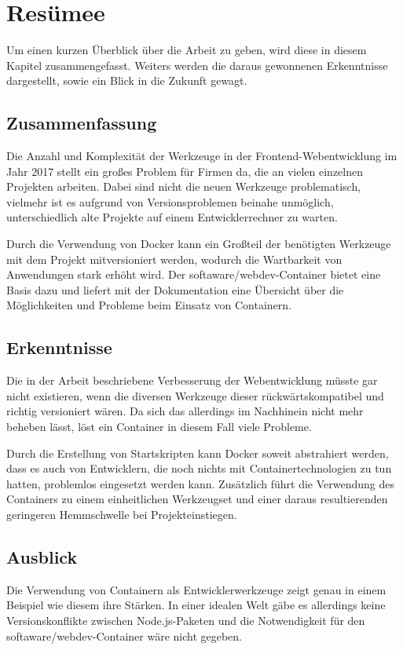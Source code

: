 \chapter{Resümee}
\label{cha:resume}
Um einen kurzen Überblick über die Arbeit zu geben, wird diese in diesem Kapitel zusammengefasst.
Weiters werden die daraus gewonnenen Erkenntnisse dargestellt, sowie ein Blick in die Zukunft gewagt.

\section{Zusammenfassung}
\label{sec:summary}
Die Anzahl und Komplexität der Werkzeuge in der Frontend-Webentwicklung im Jahr 2017 stellt ein großes Problem für Firmen da, die an vielen einzelnen Projekten arbeiten.
Dabei sind nicht die neuen Werkzeuge problematisch, vielmehr ist es aufgrund von Versionsproblemen beinahe unmöglich, unterschiedlich alte Projekte auf einem Entwicklerrechner zu warten.

Durch die Verwendung von Docker kann ein Großteil der benötigten Werkzeuge mit dem Projekt mitversioniert werden, wodurch die Wartbarkeit von Anwendungen stark erhöht wird.
Der softaware/webdev-Container bietet eine Basis dazu und liefert mit der Dokumentation eine Übersicht über die Möglichkeiten und Probleme beim Einsatz von Containern.

\section{Erkenntnisse}
\label{sec:findings}
Die in der Arbeit beschriebene Verbesserung der Webentwicklung müsste gar nicht existieren, wenn die diversen Werkzeuge dieser rückwärtskompatibel und richtig versioniert wären.
Da sich das allerdings im Nachhinein nicht mehr beheben lässt, löst ein Container in diesem Fall viele Probleme.

Durch die Erstellung von Startskripten kann Docker soweit abstrahiert werden, dass es auch von Entwicklern, die noch nichts mit Containertechnologien zu tun hatten, problemlos eingesetzt werden kann.
Zusätzlich führt die Verwendung des Containers zu einem einheitlichen Werkzeugset und einer daraus resultierenden geringeren Hemmschwelle bei Projekteinstiegen.

\section{Ausblick}
\label{sec:outlook}
Die Verwendung von Containern als Entwicklerwerkzeuge zeigt genau in einem Beispiel wie diesem ihre Stärken.
In einer idealen Welt gäbe es allerdings keine Versionskonflikte zwischen Node.js-Paketen und die Notwendigkeit für den softaware/webdev-Container wäre nicht gegeben.
